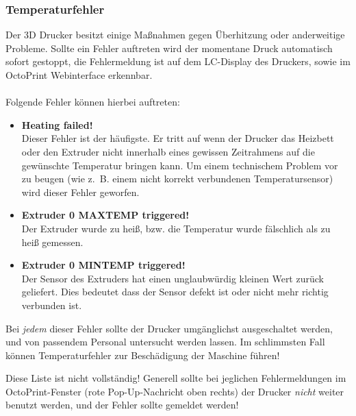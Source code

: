 \subsubsection{Temperaturfehler}

Der 3D Drucker besitzt einige Maßnahmen gegen Überhitzung oder anderweitige Probleme. Sollte ein Fehler auftreten wird der momentane Druck automatisch sofort gestoppt, die Fehlermeldung ist auf dem LC-Display des Druckers, sowie im OctoPrint Webinterface erkennbar.\\ \\
Folgende Fehler können hierbei auftreten:

\begin{itemize}
\item \textbf{Heating failed!} \\
		Dieser Fehler ist der häufigste. Er tritt auf wenn der Drucker das Heizbett oder den Extruder nicht innerhalb eines gewissen Zeitrahmens auf die gewünschte Temperatur bringen kann. Um einem technischem Problem vor zu beugen (wie z.~B. einem nicht korrekt verbundenen Temperatursensor) wird dieser Fehler geworfen.
\item \textbf{Extruder 0 MAXTEMP triggered!} \\ 
		Der Extruder wurde zu heiß, bzw. die Temperatur wurde fälschlich als zu heiß gemessen.
\item \textbf{Extruder 0 MINTEMP triggered!} \\
		Der Sensor des Extruders hat einen unglaubwürdig kleinen Wert zurück geliefert. Dies bedeutet dass der Sensor defekt ist oder nicht mehr richtig verbunden ist.
\end{itemize}

Bei \emph{jedem} dieser Fehler sollte der Drucker umgänglichst ausgeschaltet werden, und von passendem Personal untersucht werden lassen.
Im schlimmsten Fall können Temperaturfehler zur Beschädigung der Maschine führen!

Diese Liste ist nicht vollständig! 
Generell sollte bei jeglichen Fehlermeldungen im OctoPrint-Fenster (rote Pop-Up-Nachricht oben rechts) der Drucker \emph{nicht} weiter benutzt werden, und der Fehler sollte gemeldet werden!